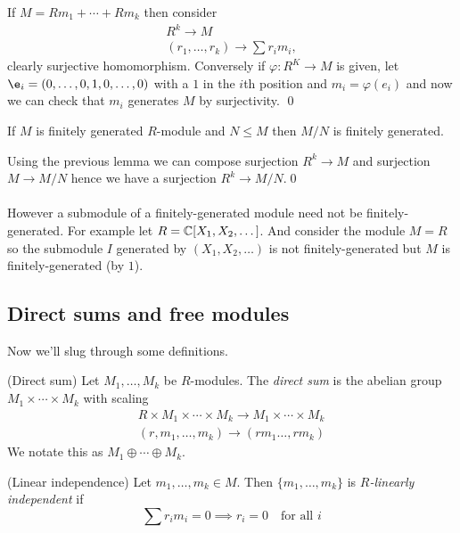 \documentclass{article}
\begin{document}
\begin{itemize}
\pf If $ M =Rm_1+\cdots+Rm_k $ then consider
\begin{align*}
  R^k\to M \\
  (r_1,\dots,r_k)\to \sum r_im_i,
\end{align*}
clearly surjective homomorphism.
Conversely if $ \varphi:R^K\to M $ is given, let $ \e_i=(0,\dots, 0,1,0,\dots, 0) $ with a $ 1 $ in the $ i $th position and $ m_i =\varphi(e_i) $ and now we can check that $ m_i $ generates $ M $ by surjectivity. \qed
\begin{corollary}
  If $ M $ is finitely generated $ R $-module and $ N\le M $ then $ M/N $ is finitely generated.
\end{corollary}
\pf Using the previous lemma we can compose surjection $ R^k\to M $ and surjection $ M\to M/N $ hence we have a surjection $ R^k\to M/N $.\qed\\\\
However a submodule of a finitely-generated module need not be finitely-generated. For example let $ R=\mathbb{C}[X_1,X_2,\dots] $. And consider the module $ M=R $ so the submodule $ I $ generated by $ (X_1,X_2,\dots) $ is not finitely-generated but $ M $ is finitely-generated (by $ 1 $).
\subsection{Direct sums and free modules}
Now we'll slug through some definitions.
\begin{definition}
	(Direct sum) Let $ M_1,\dots, M_k $ be $ R $-modules. The \textit{direct sum} is the abelian group $ M_1\times\cdots\times M_k $ with scaling
	\begin{align*}
	  R\times M_1\times\cdots\times M_k\to M_1\times \cdots \times M_k \\
	  (r,m_1,\dots, m_k)\to (rm_1\dots, rm_k)
	\end{align*}
	We notate this as $ M_1\oplus \cdots \oplus M_k $.
\end{definition}
\begin{definition}
	(Linear independence) Let $ m_1,\dots, m_k\in M $. Then $ \{m_1,\dots, m_k\} $ is $ R $\textit{-linearly independent} if
	\[
		\sum r_im_i=0\implies r_i=0\quad\text{for all } i 
	\]
\end{definition}


\end{itemize}
\end{document}
